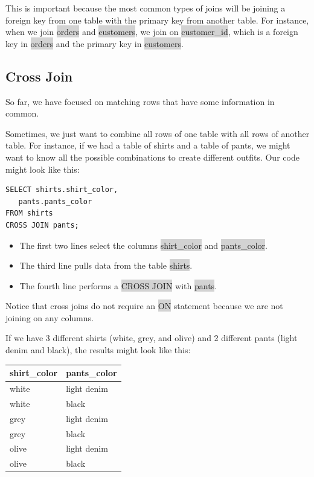 \documentclass[11pt]{article}
\begin{document}
{{{This is important because the most common types of joins will be joining a foreign key from one table with the primary key from another table. For instance, when we join \colorbox{lightgray}{orders} and \colorbox{lightgray}{customers}, we join on \colorbox{lightgray}{customer\_id}, which is a foreign key in \colorbox{lightgray}{orders} and the primary key in \colorbox{lightgray}{customers}.

\subsection{Cross Join}
So far, we have focused on matching rows that have some information in common.

Sometimes, we just want to combine all rows of one table with all rows of another table. For instance, if we had a table of shirts and a table of pants, we might want to know all the possible combinations to create different outfits. Our code might look like this:
\begin{lstlisting}
SELECT shirts.shirt_color,
   pants.pants_color
FROM shirts
CROSS JOIN pants;
\end{lstlisting}
\begin{itemize}[leftmargin = *]
\item The first two lines select the columns \colorbox{lightgray}{shirt\_color} and \colorbox{lightgray}{pants\_color}.
\item The third line pulls data from the table \colorbox{lightgray}{shirts}.
\item The fourth line performs a \colorbox{lightgray}{CROSS JOIN} with \colorbox{lightgray}{pants}.
\end{itemize}
Notice that cross joins do not require an \colorbox{lightgray}{ON} statement because we are not joining on any columns. 

If we have 3 different shirts (white, grey, and olive) and 2 different pants (light denim and black), the results might look like this:

{
\begin{tabular}{ | m{20em} | m{20em} |}
\hline
\textbf{shirt\_color} & \textbf{pants\_color} \\
\hline
white & light denim \\
\hline
white & black \\
\hline 
grey	& light denim\\
\hline 
grey	& black \\
\hline
olive	& light denim \\
\hline
olive	& black \\
\hline
\end{tabular}

}}}}
\end{document}
